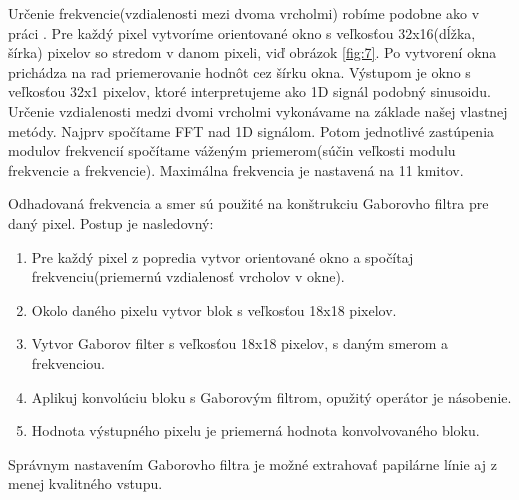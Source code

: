 \documentclass[11pt,a4paper]{article}
\begin{document}
Určenie frekvencie(vzdialenosti mezi dvoma vrcholmi) robíme podobne ako v práci \cite{hong}. Pre každý pixel vytvoríme orientované okno s veľkosťou 32x16(dĺžka, šírka) pixelov so stredom v danom pixeli, viď obrázok \ref{fig:7}. Po vytvorení okna prichádza na rad priemerovanie hodnôt cez šírku okna. Výstupom je okno s veľkosťou 32x1 pixelov, ktoré interpretujeme ako 1D signál podobný sinusoidu. Určenie vzdialenosti medzi dvomi vrcholmi vykonávame na základe našej vlastnej metódy. Najprv spočítame FFT nad 1D signálom. Potom jednotlivé zastúpenia modulov frekvencií spočítame váženým priemerom(súčin veľkosti modulu frekvencie a frekvencie). Maximálna frekvencia je nastavená na 11 kmitov. 

Odhadovaná frekvencia a smer sú použité na konštrukciu Gaborovho filtra pre daný pixel. Postup je nasledovný:

\begin{enumerate}
	\item Pre každý pixel z popredia vytvor orientované okno a spočítaj frekvenciu(priemernú vzdialenosť vrcholov v okne).
	\item Okolo daného pixelu vytvor blok s veľkosťou 18x18 pixelov.
	\item Vytvor Gaborov filter s veľkosťou 18x18 pixelov, s daným smerom a frekvenciou.
	\item Aplikuj konvolúciu bloku s Gaborovým filtrom, opužitý operátor je násobenie.
	\item Hodnota výstupného pixelu je priemerná hodnota konvolvovaného bloku.
\end{enumerate}

Správnym nastavením Gaborovho filtra je možné extrahovať papilárne línie aj z menej  kvalitného vstupu.
\end{document}
